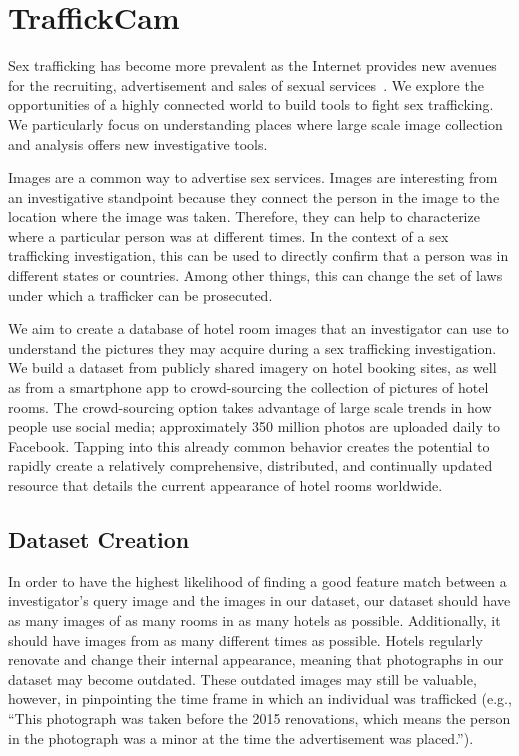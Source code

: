 
\chapter{TraffickCam}
\label{ch:3}
Sex trafficking has become more prevalent as the Internet provides new avenues for the recruiting, advertisement and sales of sexual services~\cite{kunze2009sex}. We explore the opportunities of a highly connected world to build tools to fight sex trafficking. We particularly focus on understanding places where large scale image collection and analysis offers new investigative tools.

Images are a common way to advertise sex services. Images are interesting from an investigative standpoint because they connect the person in the image to the location where the image was taken. Therefore, they can help to characterize where a particular person was at different times. In the context of a sex trafficking investigation, this can be used to
directly confirm that a person was in different states or countries. Among other things, this can change the set of laws under which a trafficker can be prosecuted.

We aim to create a database of hotel room images that an investigator can use to understand the pictures they may acquire during a sex trafficking investigation. We build a dataset from publicly shared imagery on hotel booking sites, as well as from a smartphone app to crowd-sourcing the collection of pictures of hotel rooms. The crowd-sourcing option
takes advantage of large scale trends in how people use social media; approximately 350 million photos are uploaded daily to Facebook. Tapping into this already common behavior creates the potential to rapidly create a relatively comprehensive, distributed,
and continually updated resource that details the current appearance of hotel rooms worldwide.

\section{Dataset Creation}
In order to have the highest likelihood of finding a good feature match between a investigator's query image and the images in our dataset, our dataset should have as many images of as many rooms in as many hotels as possible. Additionally, it should have images from as many different times as possible. Hotels regularly renovate and change their internal appearance, meaning that photographs in our dataset may become outdated. These outdated images may still be valuable, however, in pinpointing the time frame in which an individual was trafficked (e.g., ``This photograph was taken before the 2015 renovations, which means the person in the photograph was a minor at the time the advertisement was placed.'').

